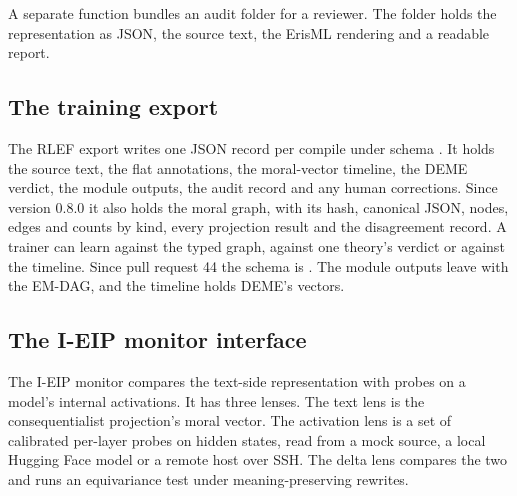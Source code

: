 A separate function bundles an audit folder for a reviewer. The folder holds the representation
as JSON, the source text, the ErisML rendering and a readable report.

\subsection{The training export}

The RLEF export writes one JSON record per compile under schema . It holds the
source text, the flat annotations, the moral-vector timeline, the DEME verdict, the module
outputs, the audit record and any human corrections. Since version 0.8.0 it also holds the moral
graph, with its hash, canonical JSON, nodes, edges and counts by kind, every projection result and
the disagreement record. A trainer can learn against the typed graph, against one theory's
verdict or against the timeline.
Since pull request 44 the schema is . The module outputs leave with the
EM-DAG, and the timeline holds DEME's vectors.

\subsection{The I-EIP monitor interface}

The I-EIP monitor compares the text-side representation with probes on a model's internal
activations. It has three lenses. The text lens is the consequentialist projection's moral vector.
The activation lens is a set of calibrated per-layer probes on hidden states, read from a mock
source, a local Hugging Face model or a remote host over SSH. The delta lens compares the two and
runs an equivariance test under meaning-preserving rewrites.

